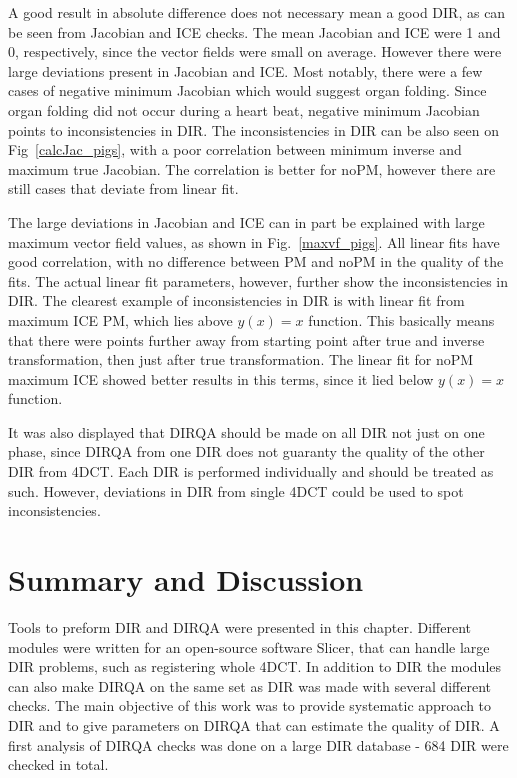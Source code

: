 \documentclass[type=dr, dr=rernat, accentcolor=tud7b,colorbacktitle, bigchapter, openright, twoside, 12pt ]{tudthesis}
\begin{document}
A good result in absolute difference does not necessary mean a good DIR, as can be seen from Jacobian and ICE checks. The mean Jacobian and ICE were 1 and 0, respectively, since the
vector fields were small on average. However there were large deviations present in Jacobian and ICE. Most notably, there were a few cases of negative minimum Jacobian which would suggest 
organ folding. Since organ folding did not occur during a heart beat, negative minimum Jacobian points to inconsistencies in DIR. The inconsistencies in DIR can be also seen on Fig~\ref{calcJac_pigs},
with a poor correlation between minimum inverse and maximum true Jacobian. The correlation is better for noPM, however there are still cases that deviate from linear fit.

The large deviations in Jacobian and ICE can in part be explained with large maximum vector field values, as shown in Fig.~\ref{maxvf_pigs}. All linear fits have good correlation, with no
difference between PM and noPM in the quality of the fits. The actual linear fit parameters, however, further show the inconsistencies in DIR. The clearest example of inconsistencies in
DIR is with linear fit from maximum ICE PM, which lies above $y(x)=x$ function. This basically means that there were points further away from starting point after true and inverse transformation, 
then just after true transformation. The linear fit for noPM maximum ICE showed better results in this terms, since it lied below $y(x)=x$ function.

It was also displayed that DIRQA should be made on all DIR not just on one phase, since DIRQA from one DIR does not guaranty the quality of the other DIR from 4DCT. Each DIR is performed individually and should be treated as such. However, deviations in DIR from single 4DCT could be used to
spot inconsistencies.




\section{Summary and Discussion}
\label{Summary}

Tools to preform DIR and DIRQA were presented in this chapter. Different modules were written for an open-source software Slicer, that can handle large DIR problems, such as registering whole 4DCT. In addition to DIR the modules can also make DIRQA on the same set as DIR was made with several different
checks. The main objective of this work was to provide systematic approach to DIR and to give parameters on DIRQA that can estimate the quality of DIR. A first analysis of DIRQA checks was done on a large DIR database - 684 DIR were checked in total.
\end{document}
